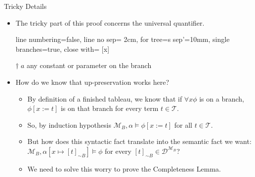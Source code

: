 \begin{frame}{Tricky Details}

	\begin{itemize}%
	\itemsep=16pt
		
	\item The tricky part of this proof concerns the universal quantifier.

	\smallskip

	\begin{center}

			\begin{prooftree}
			{
			line numbering=false,
			line no sep= 2cm,
			for tree={s sep'=10mm},
			single branches=true,
			close with=\xmark
			}
			[\forall x\phi [\phi\lbrack x:\!{=}\, a\rbrack^\dagger ] ]
			\end{prooftree}

	\bigskip
	$\dagger\; a$ any constant or parameter on the branch

	\end{center}

	\item How do we know that up-preservation works here?

		\begin{itemize}%
		\item By definition of a finished tableau, we know that if $\forall x\phi$ is on a branch, $\phi[x:=t]$ is on that branch for every term $t\in\mathcal{T}$.
		\item So, by induction hypothesis $\mathcal{M}_B,\alpha\vDash\phi[x:=t]$ for all $t\in\mathcal{T}$.
		\item But how does this syntactic fact translate into the semantic fact we want:
		$\mathcal{M}_B,\alpha[x\mapsto[t]_{\sim B}]\vDash\phi$ for every $[t]_{\sim B}\in\mathcal{D}^{\mathcal{M}_B}$?
		\item We need to solve this worry to prove the Completeness Lemma.
		\end{itemize}

	\end{itemize}

\end{frame}

